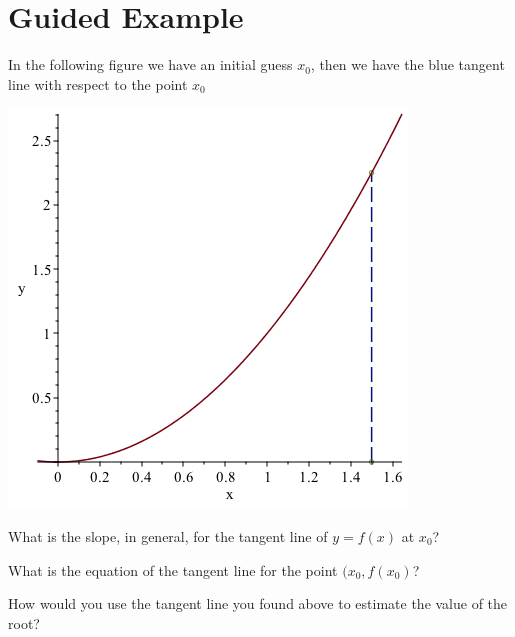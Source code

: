 \documentclass{ximera}
\begin{document}
\section{Guided Example}
In the following figure we have an initial guess $x_{0}$, then we have the blue tangent line with respect to the point $x_{0}$
\begin{image}
\includegraphics{NewtonMethod}
\end{image}
\begin{question}

What is the slope, in general, for the tangent line of $y=f(x)$ at $x_{0}$?

\begin{multipleChoice}
\end{multipleChoice}

What is the equation of the tangent line for the point $(x_{0},f(x_{0})$?

\begin{multipleChoice}
\end{multipleChoice}

How would you use the tangent line you found above to estimate the value of the root?

\begin{multipleChoice}
\end{multipleChoice}

\end{question}
\end{document}
